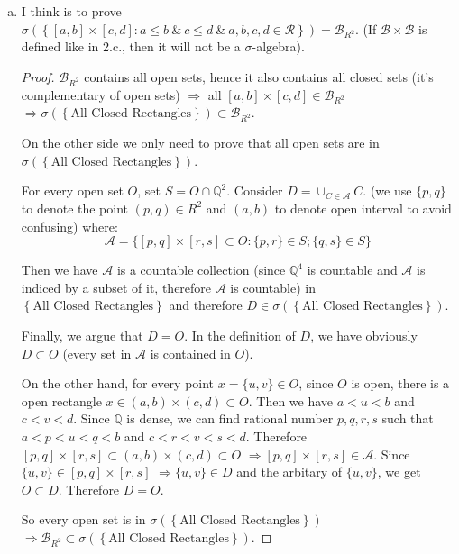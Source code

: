 \documentclass[11pt]{article}
\begin{document}
\begin{enumerate}[1.]
\begin{enumerate}[(a)]
        \item
        I think is to prove $\sigma(\left\{[a,b] \times [c,d] : a\le b\ \&\ c \le d\ \&\ a,b,c,d \in \mathcal{R}\right\}) = \mathcal{B}_{R^2}$. (If $\mathcal{B} \times \mathcal{B}$ is defined like in 2.c., then it will not be a $\sigma$-algebra).
        \begin{proof}
            $\mathcal{B}_{R^2}$ contains all open sets, hence it also contains all closed sets (it's complementary of open sets) $\Rightarrow$ all $[a,b] \times [c,d] \in \mathcal{B}_{R^2} $ $\Rightarrow \sigma(\left\{\text{All Closed Rectangles}\right\}) \subset \mathcal{B}_{R^2}$.
            
            On the other side we only need to prove that all open sets are in $\sigma(\left\{\text{All Closed Rectangles}\right\})$.
            
            For every open set $O$, set $S = O \cap \mathbb{Q}^2$. Consider $D = \cup_{C \in \mathcal{A}} C$. (we use $\{p,q\}$ to denote the point $(p,q) \in R^2$ and $(a,b)$ to denote open interval to avoid confusing) where:
            $$\mathcal{A} = \{[p,q] \times [r,s] \subset O : \{p,r\} \in S; \{q,s\} \in S\}$$
            
            Then we have $\mathcal{A}$ is a countable collection (since $\mathbb{Q}^4$ is countable and $\mathcal{A}$ is indiced by a subset of it, therefore $\mathcal{A}$ is countable) in $\left\{\text{All Closed Rectangles}\right\}$ and therefore $D \in \sigma(\left\{\text{All Closed Rectangles}\right\})$.
            
            Finally, we argue that $D = O$. In the definition of $D$, we have obviously $D \subset O$ (every set in $\mathcal{A}$ is contained in $O$). 
            
            On the other hand, for every point $x = \{u,v\} \in O$, since $O$ is open, there is a open rectangle $x \in (a,b)\times(c,d) \subset O$.
            Then we have $a < u < b$ and $c < v < d$. Since $\mathbb{Q}$ is dense, we can find rational number $p,q,r,s$ such that $a<p<u<q<b$ and $c<r<v<s<d$. 
            Therefore $[p,q]\times[r,s] \subset (a,b)\times(c,d) \subset O$ $\Rightarrow [p,q]\times[r,s] \in \mathcal{A}$. Since $\{u,v\} \in [p,q]\times[r,s]$ $\Rightarrow \{u,v\} \in D$ and the arbitary of $\{u,v\}$, we get $O \subset D$. Therefore $D = O$.

            So every open set is in $\sigma(\left\{\text{All Closed Rectangles}\right\})$ $\Rightarrow \mathcal{B}_{R^2} \subset \sigma(\left\{\text{All Closed Rectangles}\right\})$.


\end{proof}
\end{enumerate}
\end{enumerate}
\end{document}
